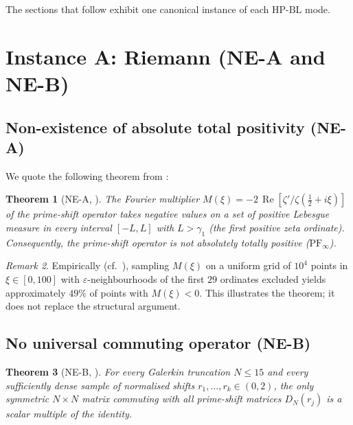 \documentclass[11pt]{article}
\newtheorem{theorem}{Theorem}[section]
\theoremstyle{definition}
\theoremstyle{remark}
\newtheorem{remark}[theorem]{Remark}
\newcommand{\HBL}{\mathrm{HP\text{-}BL}}
\renewcommand{\Re}{\operatorname{Re}}
\newcommand{\halfline}{\tfrac{1}{2}}
\begin{document}
The sections that follow exhibit one canonical instance of each
$\HBL$ mode.

\section{Instance A: Riemann (NE-A and NE-B)}
\label{sec:riemann}

\subsection{Non-existence of absolute total positivity (NE-A)}
\label{sec:ne-a}

We quote the following theorem from \cite{Geiger2026RHII}:

\begin{theorem}[NE-A, {\cite[Thm.~NE-A]{Geiger2026RHII}}]\label{thm:NE-A}
The Fourier multiplier
$M(\xi) = -2\,\Re[\zeta'/\zeta(\halfline + i\xi)]$
of the prime-shift operator takes negative values on a set of
positive Lebesgue measure in every interval $[-L, L]$ with $L > \gamma_1$
(the first positive zeta ordinate). Consequently, the prime-shift
operator is not absolutely totally positive ($\mathrm{PF}_\infty$).
\end{theorem}

\begin{remark}\label{rem:ne-a-empirical}
Empirically (cf.\ \cite[\S4.2]{Geiger2026RHII}), sampling $M(\xi)$
on a uniform grid of $10^4$ points in $\xi \in [0,100]$ with
$\varepsilon$-neighbourhoods of the first $29$ ordinates excluded
yields approximately $49\%$ of points with $M(\xi) < 0$. This
illustrates the theorem; it does not replace the structural argument.
\end{remark}

\subsection{No universal commuting operator (NE-B)}
\label{sec:ne-b}

\begin{theorem}[NE-B, {\cite[Thm.~NE-B]{Geiger2026RHII}}]\label{thm:NE-B}
For every Galerkin truncation $N \leq 15$ and every sufficiently
dense sample of normalised shifts $r_1, \ldots, r_k \in (0,2)$, the
only symmetric $N \times N$ matrix commuting with all prime-shift
matrices $D_N(r_j)$ is a scalar multiple of the identity.
\end{theorem}
\end{document}
